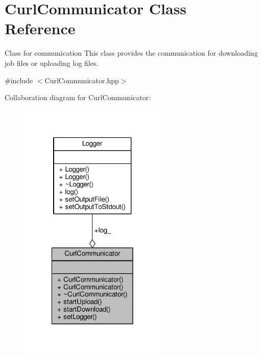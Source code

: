 \hypertarget{classCurlCommunicator}{\section{Curl\-Communicator Class Reference}
\label{classCurlCommunicator}
}


Class for communication This class provides the communication for downloading job files or uploading log files.  




{\ttfamily \#include $<$Curl\-Communicator.\-hpp$>$}



Collaboration diagram for Curl\-Communicator\-:\nopagebreak
\begin{figure}[H]
\begin{center}
\leavevmode
\includegraphics[width=198pt]{classCurlCommunicator__coll__graph}
\end{center}
\end{figure}
